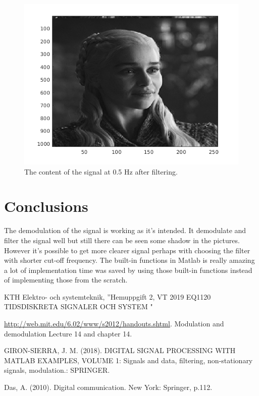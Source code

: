 \documentclass[a4paper,twocolumn]{article}
\begin{document}
\begin{figure}[H]
  \begin{center}
    \includegraphics[width=0.9\columnwidth]{emilia.png}
  \end{center}
  \caption{The content of the signal at 0.5 Hz after filtering.}
  \label{fig:emilia}
\end{figure}


\section{Conclusions}
The demodulation of the signal is working as it's intended. It demodulate and filter the signal well but still there can be seen some shadow in the pictures. However it's possible to get more clearer signal perhaps with choosing the filter with shorter cut-off frequency. The built-in functions in Matlab is really amazing a lot of implementation time was saved by using those built-in functions instead of implementing those from the scratch.

\begin{thebibliography}{99}
KTH Elektro- och systemteknik, ”Hemuppgift 2, VT 2019
EQ1120 TIDSDISKRETA SIGNALER OCH SYSTEM "


\url{http://web.mit.edu/6.02/www/s2012/handouts.shtml}.
Modulation and demodulation Lecture 14 and chapter 14.

GIRON-SIERRA, J. M. (2018). DIGITAL SIGNAL PROCESSING WITH MATLAB EXAMPLES, VOLUME 1: Signals and data, filtering, non-stationary signals, modulation.: SPRINGER.

Das, A. (2010). Digital communication. New York: Springer, p.112.
\end{thebibliography}
\end{document}
